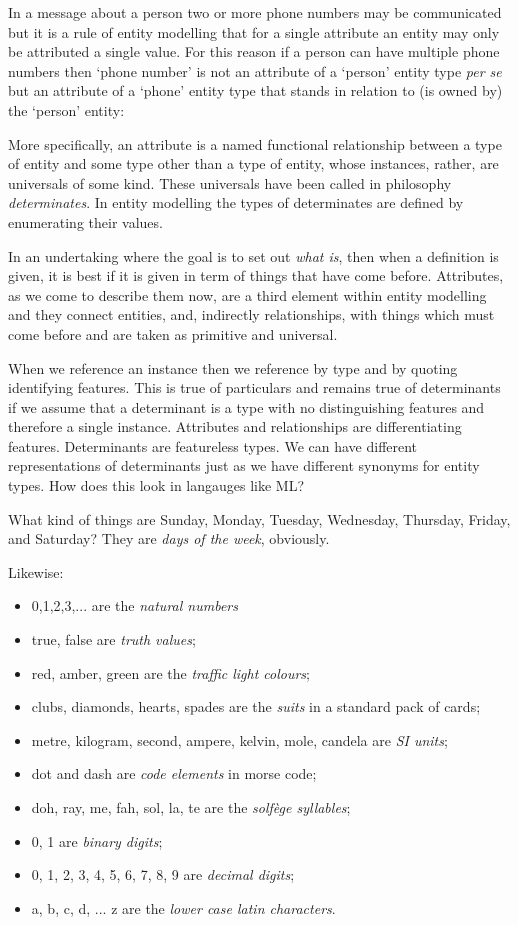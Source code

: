 \mynote 
In a message about a person two or more phone numbers may be communicated
but it is a rule of entity modelling that for a single attribute an entity may only be attributed a single value. 
For this reason if a person can have multiple phone numbers then ‘phone number’ is 
not an attribute  of a ‘person’ entity type \textit{per se} but an attribute of a ‘phone’ entity type that 
stands in relation to (is owned by) the
‘person’ entity:



More specifically, an attribute is a named functional relationship between a type of entity and some type other than a type of entity, whose instances, rather, are universals of some kind. These universals have been called in philosophy \textit{determinates}. In entity modelling the types of determinates are defined by enumerating their values. 

\mynote
In an undertaking where the goal is to set out \textit{what is}, then when a definition is given, it is best if it is given in term of things that have come before.  Attributes, as we come to describe them now, are a third element within entity modelling and they connect entities, and, indirectly relationships, 
with things  which must come before and are taken as primitive and universal. 

\mynote 
When we reference an instance then we reference by type and by quoting identifying features.
\mynote 
This is true of particulars and remains true of determinants
if we assume that a determinant is a type with no distinguishing features and
therefore a single instance.
\mynote
Attributes and relationships are differentiating features. 
Determinants are featureless types. We can have different representations of
determinants just as we have different synonyms for entity types.
\mynote 
How does this look in langauges like ML?

\mynote 
 What kind of things are Sunday, Monday, Tuesday, Wednesday, Thursday, Friday, and Saturday? They are \textit{days of the week}, obviously.

Likewise:
\begin{itemize}
  \item 0,1,2,3,... are the \textit{natural numbers}
  \item true, false are \textit{truth values};
  \item red, amber, green are the \textit{traffic light colours};
  \item clubs, diamonds, hearts, spades are the \textit{suits} in a standard pack of cards;
  \item metre, kilogram, second, ampere, kelvin, mole, candela are \textit{SI units};
  \item dot and dash are \textit{code elements} in morse code;
  \item doh, ray, me, fah, sol, la, te are the \textit{solfège syllables};
  \item 0, 1 are \textit{binary digits};
  \item 0, 1, 2, 3, 4, 5, 6, 7, 8, 9 are \textit{decimal digits};
  \item a, b, c, d, ... z are the \textit{lower case latin characters}.
\end{itemize}

